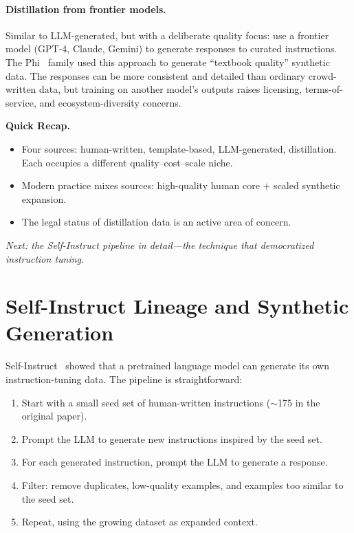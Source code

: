 \paragraph{Distillation from frontier models.} Similar to LLM-generated, but with a deliberate quality focus: use a frontier model (GPT-4, Claude, Gemini) to generate responses to curated instructions. The Phi~\cite{gunasekar2023phi} family used this approach to generate ``textbook quality'' synthetic data. The responses can be more consistent and detailed than ordinary crowd-written data, but training on another model's outputs raises licensing, terms-of-service, and ecosystem-diversity concerns.

\begin{quickrecap}
\textbf{Quick Recap.}
\begin{itemize}[nosep,leftmargin=1.5em]
  \item Four sources: human-written, template-based, LLM-generated, distillation. Each occupies a different quality--cost--scale niche.
  \item Modern practice mixes sources: high-quality human core + scaled synthetic expansion.
  \item The legal status of distillation data is an active area of concern.
\end{itemize}
\textit{Next: the Self-Instruct pipeline in detail---the technique that democratized instruction tuning.}
\end{quickrecap}


\section{Self-Instruct Lineage and Synthetic Generation}
\label{sec:self-instruct}

Self-Instruct~\cite{wang2023selfinstruct} showed that a pretrained language model can generate its own instruction-tuning data. The pipeline is straightforward:

\begin{enumerate}[nosep]
  \item Start with a small seed set of human-written instructions ($\sim$175 in the original paper).
  \item Prompt the LLM to generate new instructions inspired by the seed set.
  \item For each generated instruction, prompt the LLM to generate a response.
  \item Filter: remove duplicates, low-quality examples, and examples too similar to the seed set.
  \item Repeat, using the growing dataset as expanded context.
\end{enumerate}

